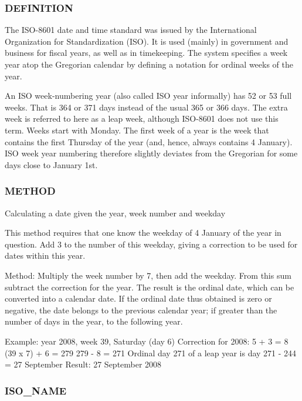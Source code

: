 \begin{DoxyVerb}
\subsubsection*{D\+E\+F\+I\+N\+I\+T\+I\+ON}

The I\+S\+O-\/8601 date and time standard was issued by the International Organization for Standardization (I\+SO). It is used (mainly) in government and business for fiscal years, as well as in timekeeping. The system specifies a week year atop the Gregorian calendar by defining a notation for ordinal weeks of the year.

An I\+SO week-\/numbering year (also called I\+SO year informally) has 52 or 53 full weeks. That is 364 or 371 days instead of the usual 365 or 366 days. The extra week is referred to here as a leap week, although I\+S\+O-\/8601 does not use this term. Weeks start with Monday. The first week of a year is the week that contains the first Thursday of the year (and, hence, always contains 4 January). I\+SO week year numbering therefore slightly deviates from the Gregorian for some days close to January 1st.

\subsubsection*{M\+E\+T\+H\+OD}

Calculating a date given the year, week number and weekday

This method requires that one know the weekday of 4 January of the year in question. Add 3 to the number of this weekday, giving a correction to be used for dates within this year.

Method\+: Multiply the week number by 7, then add the weekday. From this sum subtract the correction for the year. The result is the ordinal date, which can be converted into a calendar date. If the ordinal date thus obtained is zero or negative, the date belongs to the previous calendar year; if greater than the number of days in the year, to the following year.

Example\+: year 2008, week 39, Saturday (day 6) Correction for 2008\+: 5 + 3 = 8 (39 x 7) + 6 = 279 279 -\/ 8 = 271 Ordinal day 271 of a leap year is day 271 -\/ 244 = 27 September Result\+: 27 September 2008

\subsubsection*{I\+S\+O\+\_\+\+N\+A\+ME}


\end{DoxyVerb}
